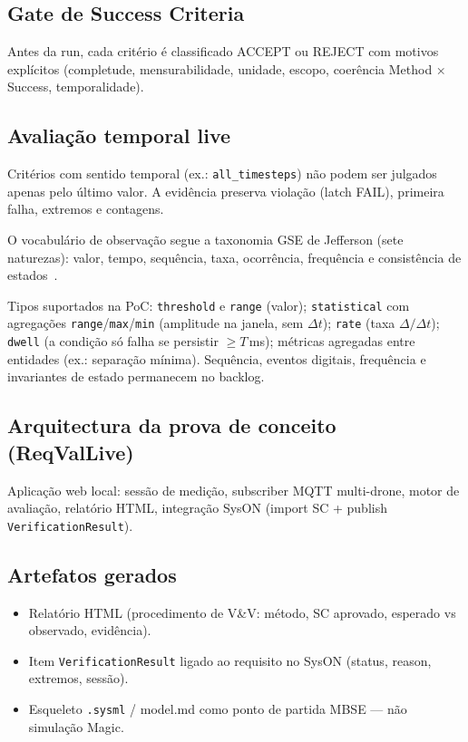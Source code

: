 \subsection{Gate de Success Criteria}

Antes da run, cada critério é classificado ACCEPT ou REJECT com motivos
explícitos (completude, mensurabilidade, unidade, escopo, coerência Method ×
Success, temporalidade).

\subsection{Avaliação temporal live}

Critérios com sentido temporal (ex.: \texttt{all\_timesteps}) não podem ser
julgados apenas pelo último valor. A evidência preserva violação (latch FAIL),
primeira falha, extremos e contagens.

O vocabulário de observação segue a taxonomia GSE de Jefferson
(sete naturezas): valor, tempo, sequência, taxa, ocorrência, frequência e
consistência de estados~\cite{jefferson2026gse}.

Tipos suportados na PoC: \texttt{threshold} e \texttt{range} (valor);
\texttt{statistical} com agregações \texttt{range}/\texttt{max}/\texttt{min}
(amplitude na janela, sem $\Delta t$);
\texttt{rate} (taxa $\Delta/\Delta t$);
\texttt{dwell} (a condição só falha se persistir $\geq T$\,ms);
métricas agregadas entre entidades (ex.: separação mínima).
Sequência, eventos digitais, frequência e invariantes de estado
permanecem no backlog.

\subsection{Arquitectura da prova de conceito (ReqValLive)}

Aplicação web local: sessão de medição, subscriber MQTT multi-drone, motor de
avaliação, relatório HTML, integração SysON (import SC + publish
\texttt{VerificationResult}).

\subsection{Artefatos gerados}

\begin{itemize}
  \item Relatório HTML (procedimento de V\&V: método, SC aprovado, esperado vs
        observado, evidência).
  \item Item \texttt{VerificationResult} ligado ao requisito no SysON (status,
        reason, extremos, sessão).
  \item Esqueleto \texttt{.sysml} / model.md como ponto de partida MBSE --- não
        simulação Magic.
\end{itemize}

